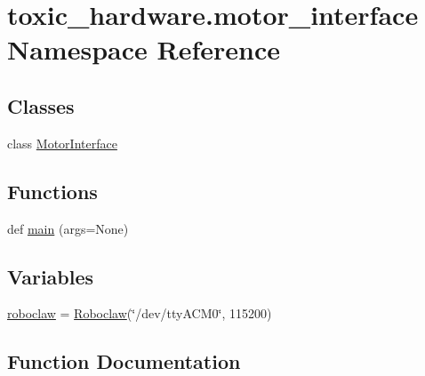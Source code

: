 \hypertarget{namespacetoxic__hardware_1_1motor__interface}{}\section{toxic\+\_\+hardware.\+motor\+\_\+interface Namespace Reference}
\label{namespacetoxic__hardware_1_1motor__interface}
\subsection*{Classes}
\begin{DoxyCompactItemize}
\item 
class \mbox{\hyperlink{classtoxic__hardware_1_1motor__interface_1_1MotorInterface}{Motor\+Interface}}
\end{DoxyCompactItemize}
\subsection*{Functions}
\begin{DoxyCompactItemize}
\item 
def \mbox{\hyperlink{namespacetoxic__hardware_1_1motor__interface_a2a214c16e0dd6e2551c72185d306001e}{main}} (args=None)
\end{DoxyCompactItemize}
\subsection*{Variables}
\begin{DoxyCompactItemize}
\item 
\mbox{\hyperlink{namespacetoxic__hardware_1_1motor__interface_a257386444c3afd4030922ffb828f85fe}{roboclaw}} = \mbox{\hyperlink{classtoxic__hardware_1_1roboclaw__3_1_1Roboclaw}{Roboclaw}}(\char`\"{}/dev/tty\+A\+C\+M0\char`\"{}, 115200)
\end{DoxyCompactItemize}


\subsection{Function Documentation}
\mbox{\label{namespacetoxic__hardware_1_1motor__interface_a2a214c16e0dd6e2551c72185d306001e}} 

